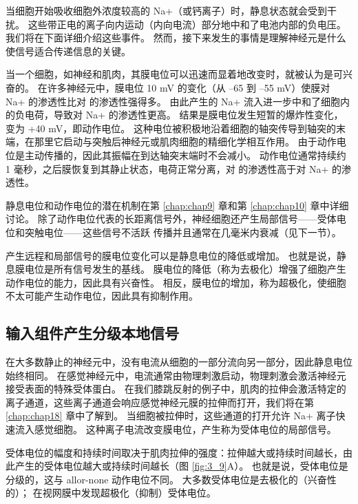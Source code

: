 当细胞开始吸收细胞外浓度较高的 Na+（或钙离子）时，静息状态就会受到干扰。 
这些带正电的离子向内运动（内向电流）部分地中和了电池内部的负电压。 
我们将在下面详细介绍这些事件。 
然而，接下来发生的事情是理解神经元是什么使信号适合传递信息的关键。


当一个细胞，如神经和肌肉，其膜电位可以迅速而显着地改变时，就被认为是可兴奋的。 
在许多神经元中，膜电位 10 mV 的变化（从 –65 到 –55 mV）使膜对 Na+ 的渗透性比对  的渗透性强得多。 
由此产生的 Na+ 流入进一步中和了细胞内的负电荷，导致对 Na+ 的渗透性更高。 
结果是膜电位发生短暂的爆炸性变化，变为 +40 mV，即动作电位。 
这种电位被积极地沿着细胞的轴突传导到轴突的末端，在那里它启动与突触后神经元或肌肉细胞的精细化学相互作用。 
由于动作电位是主动传播的，因此其振幅在到达轴突末端时不会减小。 
动作电位通常持续约 1 毫秒，之后膜恢复到其静止状态，电荷正常分离，对  的渗透性高于对 Na+ 的渗透性。


静息电位和动作电位的潜在机制在第 \ref{chap:chap9} 章和第 \ref{chap:chap10} 章中详细讨论。
除了动作电位代表的长距离信号外，神经细胞还产生局部信号——受体电位和突触电位——这些信号不活跃 传播并且通常在几毫米内衰减（见下一节）。


产生远程和局部信号的膜电位变化可以是静息电位的降低或增加。 
也就是说，静息膜电位是所有信号发生的基线。 
膜电位的降低（称为去极化）增强了细胞产生动作电位的能力，因此具有兴奋性。 
相反，膜电位的增加，称为超极化，使细胞不太可能产生动作电位，因此具有抑制作用。


\subsection{输入组件产生分级本地信号}
在大多数静止的神经元中，没有电流从细胞的一部分流向另一部分，因此静息电位始终相同。 
在感觉神经元中，电流通常由物理刺激启动，物理刺激会激活神经元接受表面的特殊受体蛋白。 
在我们膝跳反射的例子中，肌肉的拉伸会激活特定的离子通道，这些离子通道会响应感觉神经元膜的拉伸而打开，我们将在第 \ref{chap:chap18} 章中了解到。
当细胞被拉伸时，这些通道的打开允许 Na+ 离子快速流入感觉细胞。 
这种离子电流改变膜电位，产生称为受体电位的局部信号。


受体电位的幅度和持续时间取决于肌肉拉伸的强度：拉伸越大或持续时间越长，由此产生的受体电位越大或持续时间越长（图 \ref{fig:3_9}A）。 
也就是说，受体电位是分级的，这与 allor-none 动作电位不同。 
大多数受体电位是去极化的（兴奋性的）； 在视网膜中发现超极化（抑制）受体电位。

